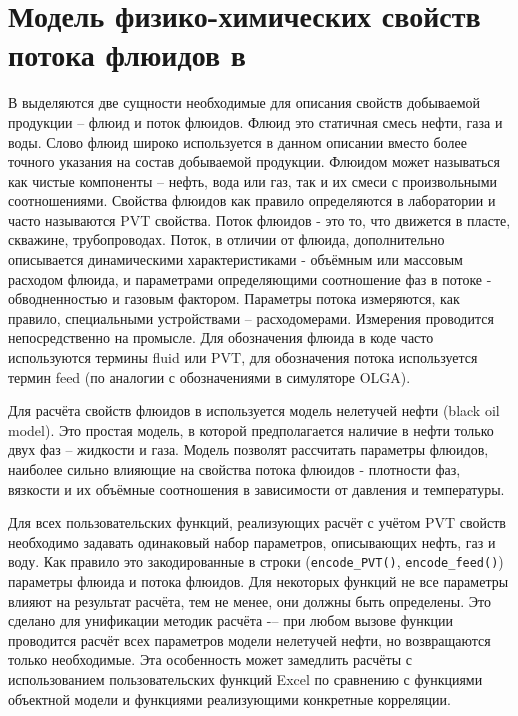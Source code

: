 \section{Модель физико-химических свойств потока флюидов в \unf{}}

В \unf{} выделяются две сущности необходимые для описания свойств добываемой продукции -- флюид и поток флюидов. Флюид это статичная смесь нефти, газа и воды. Слово флюид широко используется в данном описании вместо более точного указания на состав добываемой продукции. Флюидом может называться как чистые компоненты -- нефть, вода или газ, так и их смеси с произвольными соотношениями. Свойства флюидов как правило определяются в лаборатории и часто называются PVT свойства. Поток флюидов - это то, что движется в пласте, скважине, трубопроводах. Поток, в отличии от флюида, дополнительно описывается динамическими характеристиками - объёмным или массовым расходом флюида, и параметрами определяющими соотношение фаз в потоке - обводненностью и газовым фактором. Параметры потока измеряются, как правило, специальными устройствами -- расходомерами. Измерения проводится непосредственно на промысле. Для обозначения флюида в коде часто используются термины fluid или PVT, для обозначения потока используется термин feed (по аналогии с обозначениями в симуляторе OLGA). 

Для расчёта свойств флюидов в \unf{} используется модель нелетучей нефти (black oil model). Это простая модель, в которой предполагается наличие в нефти только двух фаз -- жидкости и газа. Модель позволят рассчитать параметры флюидов, наиболее сильно влияющие на свойства потока флюидов - плотности фаз, вязкости и их объёмные соотношения в зависимости от давления и температуры.


Для всех пользовательских функций, реализующих расчёт с учётом PVT свойств необходимо задавать одинаковый набор параметров, описывающих нефть, газ и воду. Как правило это закодированные в строки (\texttt{encode_PVT()}, \texttt{encode_feed()}) параметры флюида и потока флюидов. Для некоторых  функций не все параметры  влияют на результат расчёта, тем не менее, они должны быть определены. Это сделано для унификации методик расчёта -– при любом вызове функции проводится расчёт всех параметров модели нелетучей нефти, но возвращаются только необходимые. Эта особенность может замедлить расчёты с использованием пользовательских функций Excel по сравнению с функциями объектной модели \unf{} и функциями реализующими конкретные корреляции.
 
